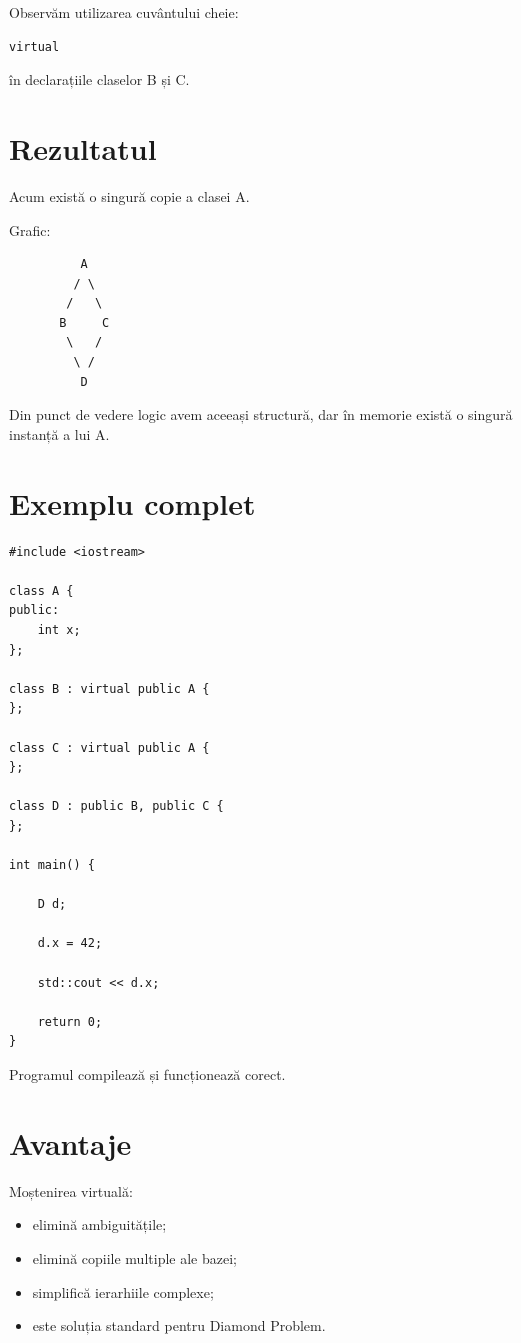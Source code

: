 \documentclass[12pt,a4paper]{article}
\begin{document}
Observăm utilizarea cuvântului cheie:

\begin{verbatim}
virtual
\end{verbatim}

în declarațiile claselor B și C.

\section{Rezultatul}

Acum există o singură copie a clasei A.

Grafic:

\begin{verbatim}
          A
         / \
        /   \
       B     C
        \   /
         \ /
          D
\end{verbatim}

Din punct de vedere logic avem aceeași structură, dar în memorie există o singură instanță a lui A.

\section{Exemplu complet}

\begin{verbatim}
#include <iostream>

class A {
public:
    int x;
};

class B : virtual public A {
};

class C : virtual public A {
};

class D : public B, public C {
};

int main() {

    D d;

    d.x = 42;

    std::cout << d.x;

    return 0;
}
\end{verbatim}

Programul compilează și funcționează corect.

\section{Avantaje}

Moștenirea virtuală:

\begin{itemize}
\item elimină ambiguitățile;
\item elimină copiile multiple ale bazei;
\item simplifică ierarhiile complexe;
\item este soluția standard pentru Diamond Problem.
\end{itemize}
\end{document}
